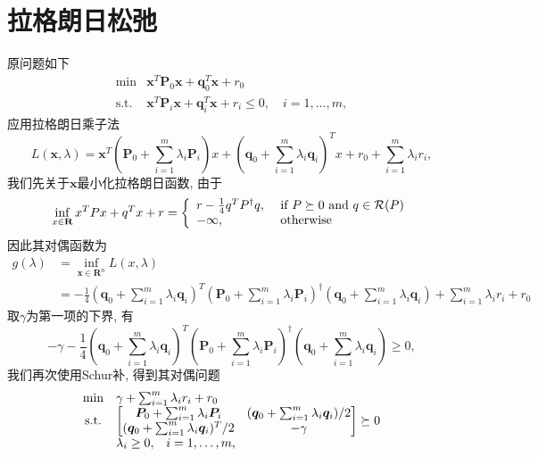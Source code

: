 \documentclass[a4paper,12pt]{article}
\begin{document}
\section{拉格朗日松弛}
原问题如下
\begin{equation} 
\begin{array}{cl}
{\min}  & {\bm{x}^T \bm{P}_0 \bm{x} + \bm{q}_0^T \bm{x} + r_0} \\
{\text{s.t.}} & {\bm{x}^T \bm{P}_i \bm{x} + \bm{q}_i^T \bm{x} + r_i \leq 0, \quad i = 1,\dots,m},
\end{array}
\end{equation}
应用拉格朗日乘子法
\begin{equation}
L (\bm{x},\lambda) = \bm{x} ^ {T} \left(\bm{P}_{0} + \sum_{i=1}^{m} \lambda_{i} \bm{P}_{i} \right) x + \left(\bm{q}_{0} + \sum _ {i=1}^{m} \lambda_{i} \bm{q}_{i} \right)^{T}x + r_{0} + \sum_{i=1}^{m} \lambda_{i} r_{i},
\end{equation}
我们先关于$\bm{x}$最小化拉格朗日函数, 由于
\begin{equation}
\inf _ { x \in \mathbf { R } } x ^ { T } P x + q ^ { T } x + r = \left\{ \begin{array} { l l } { r - \frac { 1 } { 4 } q ^ { T } P ^ { \dagger } q , } & { \text { if } P \succeq 0 \text { and } q \in \mathcal { R } ( P ) } \\ { - \infty , } & { \text { otherwise } } \end{array} \right.
\end{equation}
因此其对偶函数为
\begin{equation}
\begin{aligned} 
g (\lambda) & = \inf_{\bm{x} \in \mathbf {R}^{n}} L (x,\lambda) \\ & = - \frac {1} {4} \left( \bm{q}_{0} + \sum_{i=1}^{m} \lambda_{i} \bm{q}_{i} \right)^{T} \left(\bm{P}_{0} + \sum_{i=1}^{m } \lambda_{i} \bm{P}_{i} \right)^{\dagger} \left(\bm{q}_{0} + \sum_{i=1}^{m} \lambda_{i} \bm{q}_{i} \right) + \sum_{i=1}^{m} \lambda_{i}r_{i} + r_{0} 
\end{aligned}
\end{equation}
取$\gamma$为第一项的下界, 有
\begin{equation}
-\gamma - \frac {1} {4} \left( \bm{q}_{0} + \sum_{i=1}^{m} \lambda_{i} \bm{q}_{i} \right)^{T} \left(\bm{P}_{0} + \sum_{i=1}^{m } \lambda_{i} \bm{P}_{i} \right)^{\dagger} \left(\bm{q}_{0} + \sum_{i=1}^{m} \lambda_{i} \bm{q}_{i} \right) \ge 0,
\end{equation}
我们再次使用Schur补, 得到其对偶问题
\begin{equation}
\begin{array} { c l } 
{\min} & { \gamma + \sum_{i=1}^{m} \lambda_{i} r_{i} + r_{0} } \\ 
{\text {s.t.}} & 
{\begin{bmatrix} 
{\bm{P}_0 + \sum_{i=1}^m \lambda_i \bm{P}_i} & {(\bm{q}_0 + \sum_{i=1}^m \lambda_i \bm{q}_i)/2} \\
{(\bm{q}_0 + \sum_{i=1}^m \lambda_i \bm{q}_i)^T/2} & {-\gamma}
\end{bmatrix} \succeq 0} \\ 
{} & {\lambda_{i} \geq 0,} {\quad i=1, \ldots ,m}, 
\end{array}
\end{equation}
\end{document}
